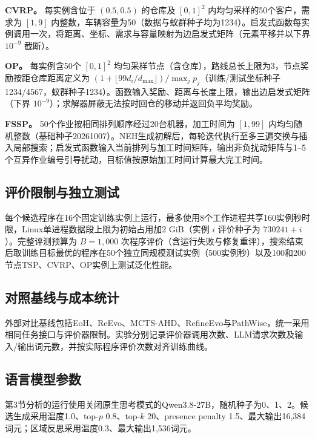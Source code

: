 \documentclass{article}
\begin{document}
\textbf{CVRP。} 每实例含位于 \((0.5,0.5)\) 的仓库及 \([0,1]^2\) 内均匀采样的50个客户，需求为 \([1,9]\) 内整数，车辆容量为50（数据与蚁群种子均为1234）。启发式函数每实例调用一次，将距离、坐标、需求与容量映射为边启发式矩阵（元素平移并以下界 \(10^{-9}\) 截断）。

\textbf{OP。} 每实例含50个 \([0,1]^2\) 均匀采样节点（含仓库），路线总长上限为3，节点奖励按距仓库距离定义为 \((1+\lfloor99d_i/d_{\max}\rfloor)/\max_j p_j\)（训练/测试坐标种子1234/4567，蚁群种子1234）。函数输入奖励、距离与长度上限，输出边启发式矩阵（下界 \(10^{-9}\)）；求解器屏蔽无法按时回仓的移动并返回负平均奖励。

\textbf{FSSP。} 50个作业按相同排列顺序经过20台机器，加工时间为 \([1,99]\) 内均匀随机整数（基础种子20261007）。NEH生成初解后，每轮迭代执行至多三遍交换与插入局部搜索；启发式函数输入当前排列与加工时间矩阵，输出非负扰动矩阵与1--5个互异作业编号引导扰动，目标值按原始加工时间计算最大完工时间。

\subsection{评价限制与独立测试}\label{ux8bc4ux4ef7ux9650ux5236ux4e0eux72ecux7acbux6d4bux8bd5}

每个候选程序在16个固定训练实例上运行，最多使用8个工作进程共享160实例秒时限，Linux单进程数据段上限为初始占用加2 GiB（实例 \(i\) 评价种子为 \(730241+i\)）。完整评测预算为 \(B=1{,}000\) 次程序评价（含运行失败与修复重评），搜索结束后取训练目标最优的程序在50个独立同规模测试实例（500实例秒）以及100和200节点TSP、CVRP、OP实例上测试泛化性能。

\subsection{对照基线与成本统计}\label{ux5bf9ux7167ux57faux7ebfux4e0eux6210ux672cux7edfux8ba1}

外部对比基线包括EoH\citep{eoh}、ReEvo\citep{reevo}、MCTS-AHD\citep{mctsahd}、RefineEvo\citep{refineevo}与PathWise\citep{pathwise}，统一采用相同任务接口与评价器限制。实验分别记录评价器调用次数、LLM请求次数及输入/输出词元数，并按实际程序评价次数对齐训练曲线。

\subsection{语言模型参数}\label{ux8bedux8a00ux6a21ux578bux53c2ux6570}

第3节分析的运行使用关闭原生思考模式的Qwen3.8-27B，随机种子为0、1、2。候选生成采用温度1.0、top-\(p\) 0.8、top-\(k\) 20、presence penalty 1.5、最大输出16,384词元；区域反思采用温度0.3、最大输出1,536词元。
\end{document}
